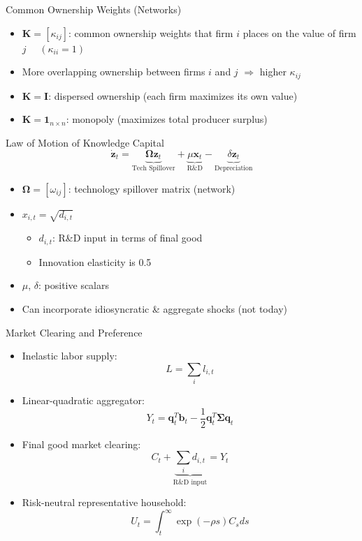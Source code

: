 \documentclass[
  10pt,
  aspectratio=169,   %
]{beamer}
\theoremstyle{plain}
\begin{document}
\begin{frame}{Common Ownership Weights (Networks)}
  \label{ownership_weight}
  \begin{itemize}
    \item $\bm{K}=\left[\kappa_{ij}\right]$: common ownership weights that firm $i$ places on the value of firm $j$ $\quad (\kappa_{ii} = 1)$
          \medskip{}
    \item More overlapping ownership between firms $i$ and $j$ $\Longrightarrow$ higher $\kappa_{ij}$ \hfill\hyperlink{rotemberg}{}
          \medskip{}
    \item $\bm{K}=\bm{I}$: dispersed ownership (each firm maximizes its own value)
          \medskip{}
    \item $\bm{K}=\bm{1}_{n \times n}$: monopoly (maximizes total producer surplus)
  \end{itemize}
\end{frame}

\begin{frame}{Law of Motion of Knowledge Capital}
  \[
    \dot{\bm{z}}_{t}=\underbrace{\bm{\Omega}\bm{z}_{t}}_{\text{Tech Spillover}}+\underbrace{\mu\bm{x}_{t}}_{\text{R\&D}}-\underbrace{\delta\bm{z}_{t}}_{\text{Depreciation}}
  \]
  \begin{itemize}
    \item $\bm{\Omega}=\left[\omega_{ij}\right]$: technology spillover matrix (network)\medskip{}
    \item $x_{i,t}=\sqrt{d_{i,t}}$
          \begin{itemize}
            \item $d_{i,t}$: R\&D input in terms of final good
            \item Innovation elasticity is 0.5\medskip{}
          \end{itemize}
    \item $\mu$, $\delta$: positive scalars
          \medskip{}
    \item Can incorporate idiosyncratic \& aggregate shocks (not today)
  \end{itemize}
\end{frame}

\begin{frame}{Market Clearing and Preference}
  \begin{itemize}
    \item Inelastic labor supply:
          \[
            L=\sum_{i}l_{i,t}
          \]
    \item Linear-quadratic aggregator:
          \[
            Y_{t}=\bm{q}_{t}^{T}\bm{b}_{t}-\frac{1}{2}\bm{q}_{t}^{T}\bm{\Sigma}\bm{q}_{t}
          \]
    \item Final good market clearing:
          \[
            C_{t}+\underbrace{\sum_{i}d_{i,t}}_{\text{R\&D input}}=Y_{t}
          \]
    \item Risk-neutral representative household:
          \[
            U_t = \int_{t}^{\infty}\exp\left(-\rho s\right)C_{s}ds
          \]
  \end{itemize}
\end{frame}
\end{document}
